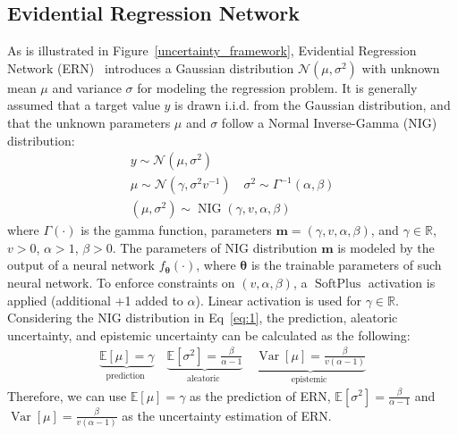 \subsection{Evidential Regression Network}
As is illustrated in Figure~\ref{uncertainty_framework}, Evidential Regression Network (ERN)~\cite{NEURIPS2020_aab08546} introduces a Gaussian distribution $\mathcal{N}\left(\mu, \sigma^2\right)$ with unknown mean $\mu$ and variance $\sigma$ for modeling the regression problem. It is generally assumed that a target value $y$ is drawn i.i.d. from the Gaussian distribution, and that the unknown parameters $\mu$ and $\sigma$ follow a Normal Inverse-Gamma (NIG) distribution:
\begin{equation} \label{eq:1}
\begin{gathered}
y \sim \mathcal{N}\left(\mu, \sigma^2\right) \\
\mu \sim \mathcal{N}\left(\gamma, \sigma^2 v^{-1}\right) \quad \sigma^2 \sim \Gamma^{-1}(\alpha, \beta) \\
(\mu, \sigma^2) \sim \operatorname{NIG}(\gamma, v, \alpha, \beta)
\end{gathered}
\end{equation}
where $\Gamma(\cdot)$ is the gamma function, parameters $\boldsymbol{m}=(\gamma, v, \alpha, \beta)$, and $\gamma \in \mathbb{R}$, $v>0$, $\alpha>1$, $\beta>0$. The parameters of NIG distribution $\boldsymbol{m}$ is modeled by the output of a neural network $f_{\boldsymbol{\theta}}(\cdot)$, where $\boldsymbol{\theta}$ is the trainable parameters of such neural network. To enforce constraints on $(v, \alpha, \beta)$, a $\operatorname{SoftPlus}$ activation is applied (additional +1 added to $\alpha$). Linear activation is used for $\gamma \in \mathbb{R}$.
Considering the NIG distribution in Eq~\ref{eq:1}, the prediction, aleatoric uncertainty, and epistemic uncertainty can be calculated as the following:
\begin{equation}
\begin{gathered}
\underbrace{\mathbb{E}[\mu]=\gamma}_{\text {prediction }} 
\quad \underbrace{\mathbb{E}\left[\sigma^2\right]=\frac{\beta}{\alpha-1}}_{\text {aleatoric }} \quad  \underbrace{\operatorname{Var}[\mu]=\frac{\beta}{v(\alpha-1)}}_{\text {epistemic }} 
\end{gathered}
\end{equation}
Therefore, we can use $\mathbb{E}[\mu]=\gamma$ as the prediction of ERN, $\mathbb{E}\left[\sigma^2\right]=\frac{\beta}{\alpha-1}$ and $\operatorname{Var}[\mu]=\frac{\beta}{v(\alpha-1)}$ as the uncertainty estimation of ERN.

